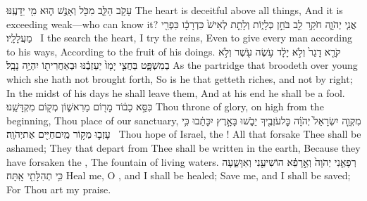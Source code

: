 {עָקֹ֥ב הַלֵּ֛ב מִכֹּ֖ל וְאָנֻ֣שׁ ה֑וּא מִ֖י יֵדָעֶֽנּוּ׃}
{The heart is deceitful above all things, And it is exceeding weak—who can know it?}
{אֲנִ֧י יְהֹוָ֛ה חֹקֵ֥ר לֵ֖ב בֹּחֵ֣ן כְּלָי֑וֹת וְלָתֵ֤ת לְאִישׁ֙ כִּדְרָכָ֔ו כִּפְרִ֖י מַעֲלָלָֽיו׃ \setuma }
{I the \lord\space search the heart, I try the reins, Even to give every man according to his ways, According to the fruit of his doings.}
{קֹרֵ֤א דָגַר֙ וְלֹ֣א יָלָ֔ד עֹ֥שֶׂה עֹ֖שֶׁר וְלֹ֣א בְמִשְׁפָּ֑ט בַּחֲצִ֤י יָמָו֙ יַעַזְבֶ֔נּוּ וּבְאַחֲרִית֖וֹ יִהְיֶ֥ה נָבָֽל׃}
{As the partridge that broodeth over young which she hath not brought forth, So is he that getteth riches, and not by right; In the midst of his days he shall leave them, And at his end he shall be a fool.}
{כִּסֵּ֣א כָב֔וֹד מָר֖וֹם מֵרִאשׁ֑וֹן מְק֖וֹם מִקְדָּשֵֽׁנוּ׃}
{Thou throne of glory, on high from the beginning, Thou place of our sanctuary,}
{מִקְוֵ֤ה יִשְׂרָאֵל֙ יְהֹוָ֔ה כׇּל\maqqaf עֹזְבֶ֖יךָ יֵבֹ֑שׁוּ  בָּאָ֣רֶץ יִכָּתֵ֔בוּ כִּ֥י עָזְב֛וּ מְק֥וֹר מַֽיִם\maqqaf חַיִּ֖ים אֶת\maqqaf יְהֹוָֽה׃ \petucha }
{Thou hope of Israel, the \lord! All that forsake Thee shall be ashamed; They that depart from Thee shall be written in the earth, Because they have forsaken the \lord, The fountain of living waters.}
{רְפָאֵ֤נִי יְהֹוָה֙ וְאֵ֣רָפֵ֔א הוֹשִׁיעֵ֖נִי וְאִוָּשֵׁ֑עָה כִּ֥י תְהִלָּתִ֖י אָֽתָּה׃}
{Heal me, O \lord, and I shall be healed; Save me, and I shall be saved; For Thou art my praise.}
\newperek
